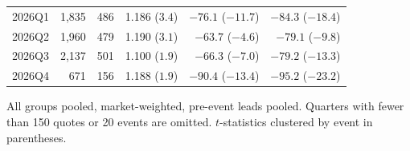 \begin{table}[htbp]
\begin{threeparttable}
\begin{tabular}{@{}lrrrrr@{}}
2026Q1 & 1{,}835 & 486 & 1.186 ($3.4$) & $-76.1$ ($-11.7$) & $-84.3$ ($-18.4$) \\
2026Q2 & 1{,}960 & 479 & 1.190 ($3.1$) & $-63.7$ ($-4.6$) & $-79.1$ ($-9.8$) \\
2026Q3 & 2{,}137 & 501 & 1.100 ($1.9$) & $-66.3$ ($-7.0$) & $-79.2$ ($-13.3$) \\
2026Q4 & 671 & 156 & 1.188 ($1.9$) & $-90.4$ ($-13.4$) & $-95.2$ ($-23.2$) \\
\bottomrule
\end{tabular}
\begin{tablenotes}\footnotesize
\item All groups pooled, market-weighted, pre-event leads pooled. Quarters with fewer than 150
quotes or 20 events are omitted. $t$-statistics clustered by event in parentheses.
\end{tablenotes}
\end{threeparttable}
\end{table}

